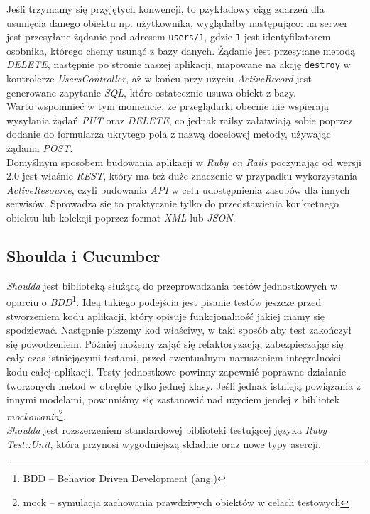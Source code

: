 \documentclass[a4paper,12pt]{article}
\begin{document}
Jeśli trzymamy się przyjętych konwencji, to pzykładowy ciąg zdarzeń dla usunięcia danego
obiektu np. użytkownika, wyglądałby następująco: na serwer jest przesyłane żądanie pod
adresem \texttt{users/1}, gdzie \texttt{1} jest identyfikatorem osobnika, którego chemy
usunąć z bazy danych. Żądanie jest przesyłane metodą \emph{DELETE}, następnie po stronie
naszej aplikacji, mapowane na akcję \texttt{destroy} w kontrolerze \emph{UsersController},
aż w końcu przy użyciu \emph{ActiveRecord} jest generowane zapytanie \emph{SQL}, które
ostatecznie usuwa obiekt z bazy.\\
Warto wspomnieć w tym momencie, że przeglądarki obecnie nie wspierają wysyłania żądań
\emph{PUT} oraz \emph{DELETE}, co jednak railsy załatwiają sobie poprzez dodanie do
formularza ukrytego pola z nazwą docelowej metody, używając żądania \emph{POST}.\\
Domyślnym sposobem budowania aplikacji w \emph{Ruby on Rails} poczynając od wersji 2.0
jest właśnie \emph{REST}, który ma też duże znaczenie w przypadku wykorzystania \emph
{ActiveResource}, czyli budowania \emph{API} w celu udostępnienia zasobów dla innych
serwisów. Sprowadza się to praktycznie tylko do przedstawienia konkretnego obiektu lub
kolekcji poprzez format \emph{XML} lub \emph{JSON}.


\subsection{Shoulda i Cucumber}
\emph{Shoulda} jest biblioteką służącą do przeprowadzania testów jednostkowych w oparciu o
\emph{BDD}\footnote{BDD -- Behavior Driven Development (ang.)}. Ideą takiego podejścia
jest pisanie testów jeszcze przed stworzeniem kodu aplikacji, który opisuje funkcjonalność
jakiej mamy się spodziewać. Następnie piszemy kod właściwy, w taki sposób aby test
zakończył się powodzeniem. Później możemy zająć się refaktoryzacją, zabezpieczając się
cały czas istniejącymi testami, przed ewentualnym naruszeniem integralności kodu całej
aplikacji. Testy jednostkowe powinny zapewnić poprawne działanie tworzonych metod w
obrębie tylko jednej klasy. Jeśli jednak istnieją powiązania z innymi modelami, powinniśmy
się zastanowić nad użyciem jendej z bibliotek \emph{mockowania}\footnote{mock -- symulacja
zachowania prawdziwych obiektów w celach testowych}.\\
\emph{Shoulda} jest rozszerzeniem standardowej biblioteki testującej języka \emph{Ruby}
\emph{Test::Unit}, która przynosi wygodniejszą składnie oraz nowe typy asercji.
\end{document}
